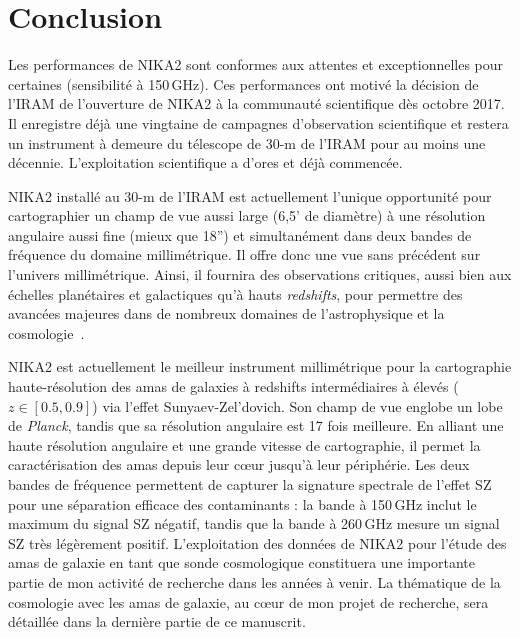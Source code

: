 \section{Conclusion}
Les performances de NIKA2 sont conformes aux attentes
et exceptionnelles pour certaines (sensibilité à 150\,GHz). Ces
performances ont motivé la décision de l'IRAM de
l'ouverture de NIKA2 à la communauté scientifique dès octobre 2017.
Il enregistre déjà une vingtaine de campagnes d'observation scientifique et restera
un instrument à demeure du télescope de 30-m de l'IRAM pour
au moins une décennie. L'exploitation scientifique a d'ores et déjà
commencée.

NIKA2 installé au 30-m de l'IRAM est actuellement l'unique opportunité
pour cartographier un champ de vue aussi large (6,5' de diamètre) à
une résolution angulaire aussi fine (mieux que 18'') et simultanément
dans deux bandes de fréquence du domaine millimétrique. Il offre donc
une vue sans précédent sur l'univers millimétrique. Ainsi, il fournira
des observations critiques, aussi bien aux échelles planétaires et
galactiques qu'à hauts \emph{redshifts}, pour permettre des avancées
majeures dans de nombreux domaines de l'astrophysique et la
cosmologie~\citep[\emph{e.g.}][]{Rigby2018, Bracco2017, Bethermin2017_simu, Mancuso2016,
  Ruppin2019a}.


NIKA2 est actuellement le meilleur instrument millimétrique pour la cartographie
haute-résolution des amas de galaxies à redshifts intermédiaires à
élevés ($z\in[0.5, 0.9]$) via l'effet Sunyaev-Zel'dovich. Son champ de
vue englobe un lobe de \emph{Planck}, tandis que sa résolution
angulaire est 17 fois meilleure. En alliant une haute résolution
angulaire et une grande vitesse de cartographie, il permet la
caractérisation des amas depuis leur cœur jusqu'à leur
périphérie. Les deux bandes de fréquence permettent de capturer
la signature spectrale de l'effet SZ pour une séparation
efficace des contaminants : la bande à 150\,GHz inclut le
maximum du signal SZ négatif, tandis que la bande à 260\,GHz mesure un
signal SZ très légèrement positif. L'exploitation des données de NIKA2
pour l'étude des amas de galaxie en tant que sonde cosmologique
constituera une importante partie de mon activité de recherche dans les
années à venir. La thématique de la cosmologie avec les amas de
galaxie, au cœur de mon projet de recherche, sera détaillée dans la
dernière partie de ce manuscrit.

